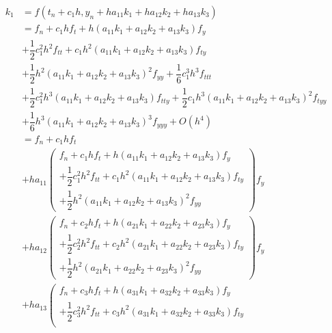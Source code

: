 \documentclass[a4paper,oneside]{book}
\numberwithin{equation}{chapter}
\begin{document}
\begin{align}
{k_1} &= f\left( {{t_n} + {c_1}h,{y_n} + h{a_{11}}{k_1} + h{a_{12}}{k_2} + h{a_{13}}{k_3}} \right)\\
 &= {f_n} + {c_1}h{f_t} + h\left( {{a_{11}}{k_1} + {a_{12}}{k_2} + {a_{13}}{k_3}} \right){f_y}\\
 &+ \dfrac{1}{2}c_1^2{h^2}{f_{tt}} + {c_1}{h^2}\left( {{a_{11}}{k_1} + {a_{12}}{k_2} + {a_{13}}{k_3}} \right){f_{ty}}\\
 &+ \dfrac{1}{2}{h^2}{\left( {{a_{11}}{k_1} + {a_{12}}{k_2} + {a_{13}}{k_3}} \right)^2}{f_{yy}} + \dfrac{1}{6}c_1^3{h^3}{f_{ttt}}\\
& + \dfrac{1}{2}c_1^2{h^3}\left( {{a_{11}}{k_1} + {a_{12}}{k_2} + {a_{13}}{k_3}} \right){f_{tty}} + \dfrac{1}{2}{c_1}{h^3}{\left( {{a_{11}}{k_1} + {a_{12}}{k_2} + {a_{13}}{k_3}} \right)^2}{f_{tyy}}\\
& + \dfrac{1}{6}{h^3}{\left( {{a_{11}}{k_1} + {a_{12}}{k_2} + {a_{13}}{k_3}} \right)^3}{f_{yyy}} + O\left( {{h^4}} \right)\\
& = {f_n} + {c_1}h{f_t} \\
& + h{a_{11}}\left( \begin{array}{l}
{f_n} + {c_1}h{f_t} + h\left( {{a_{11}}{k_1} + {a_{12}}{k_2} + {a_{13}}{k_3}} \right){f_y}\\
 + \dfrac{1}{2}c_1^2{h^2}{f_{tt}} + {c_1}{h^2}\left( {{a_{11}}{k_1} + {a_{12}}{k_2} + {a_{13}}{k_3}} \right){f_{ty}}\\
 + \dfrac{1}{2}{h^2}{\left( {{a_{11}}{k_1} + {a_{12}}{k_2} + {a_{13}}{k_3}} \right)^2}{f_{yy}}
\end{array} \right){f_y}\\
 &+ h{a_{12}}\left( \begin{array}{l}
{f_n} + {c_2}h{f_t} + h\left( {{a_{21}}{k_1} + {a_{22}}{k_2} + {a_{23}}{k_3}} \right){f_y}\\
 + \dfrac{1}{2}c_2^2{h^2}{f_{tt}} + {c_2}{h^2}\left( {{a_{21}}{k_1} + {a_{22}}{k_2} + {a_{23}}{k_3}} \right){f_{ty}}\\
 + \dfrac{1}{2}{h^2}{\left( {{a_{21}}{k_1} + {a_{22}}{k_2} + {a_{23}}{k_3}} \right)^2}{f_{yy}}
\end{array} \right){f_y}\\
 &+ h{a_{13}}\left( \begin{array}{l}
{f_n} + {c_3}h{f_t} + h\left( {{a_{31}}{k_1} + {a_{32}}{k_2} + {a_{33}}{k_3}} \right){f_y}\\
 + \dfrac{1}{2}c_3^2{h^2}{f_{tt}} + {c_3}{h^2}\left( {{a_{31}}{k_1} + {a_{32}}{k_2} + {a_{33}}{k_3}} \right){f_{ty}}\\

\end{array}
\end{align}
\end{document}
